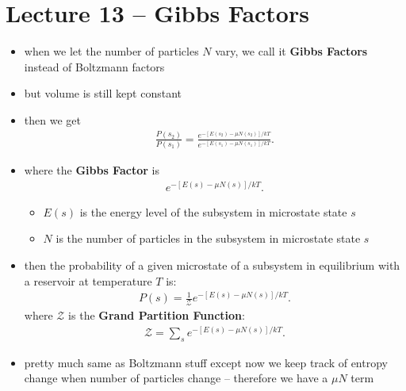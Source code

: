 \documentclass[10pt]{article}
\begin{document}
\section{Lecture 13 -- Gibbs Factors}
\begin{itemize}
    \item when we let the number of particles $N$ vary, we call it \textbf{Gibbs Factors} instead of Boltzmann factors
    \item but volume is still kept constant
    \item then we get 
        \begin{gather*}
            \frac{P(s_2)}{P(s_1)} = \frac{e^{-[E(s_2) - \mu N(s_2)] / kT}}{e^{-[E(s_1) - \mu N(s_1)] / kT}}
        .\end{gather*}
    \item where the \textbf{Gibbs Factor} is 
        \begin{gather*}
            e^{-[E(s) - \mu N(s)] / kT}
        .\end{gather*}
        \begin{itemize}
            \item $E(s)$ is the energy level of the subsystem in microstate state $s$
            \item $N$ is the number of particles in the subsystem in microstate state $s$
        \end{itemize}
    \item then the probability of a given microstate of a subsystem in equilibrium with a reservoir at temperature $T$ is: 
        \begin{gather*}
            P(s) = \frac{1}{\mathcal{Z}} e^{-[E(s) - \mu N(s)] / kT}
        .\end{gather*}
        where $\mathcal{Z}$ is the \textbf{Grand Partition Function}: 
        \begin{gather*}
            \mathcal{Z} = \sum_{s} e^{-[E(s) - \mu N(s)] / kT}
        .\end{gather*}
    \item pretty much same as Boltzmann stuff except now we keep track of entropy change when number of particles change -- therefore we have a $\mu N$ term
\end{itemize}
\end{document}
